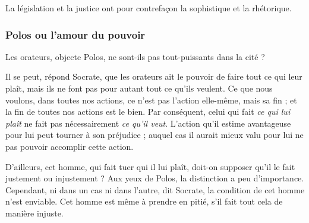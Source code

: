 \documentclass[fontsize=26pt,a4paper]{scrartcl}
\begin{document}
La législation et la justice ont pour contrefaçon la sophistique et la rhétorique.%


\subsubsection*{Polos ou l'amour du pouvoir}

Les orateurs, objecte Polos, ne sont-ils pas tout-puissants dans la cité ?%

Il se peut, répond Socrate, que les orateurs ait le pouvoir de faire tout ce qui leur plaît, mais ils ne font pas pour autant tout ce qu'ils veulent. Ce que nous voulons, dans toutes nos actions, ce n'est pas l'action elle-même, mais sa fin ; et la fin de toutes nos actions est le bien. Par conséquent, celui qui fait \emph{ce qui lui plaît} ne fait pas nécessairement \emph{ce qu'il veut}. L'action qu'il estime avantageuse pour lui peut tourner à son préjudice ; auquel cas il aurait mieux valu pour lui ne pas pouvoir accomplir cette action.%


D'ailleurs, cet homme, qui fait tuer qui il lui plaît, doit-on supposer qu'il le fait justement ou injustement ? Aux yeux de Polos, la distinction a peu d'importance. Cependant, ni dans un cas ni dans l'autre, dit Socrate, la condition de cet homme n'est enviable. Cet homme est même à prendre en pitié, s'il fait tout cela de manière injuste.%
\end{document}
